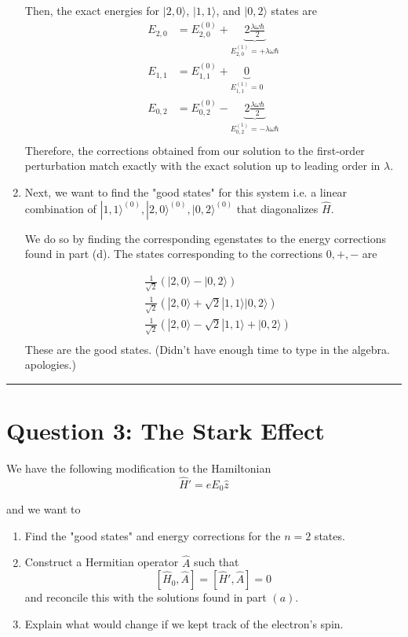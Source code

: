 \documentclass{article}
\newcommand{\ket}[1]{|#1 \rangle}
\begin{document}
\begin{enumerate}[label=(\alph*)]
  Then, the exact energies for $\ket{2,0}$, $\ket{1,1}$, and $\ket{0, 2}$ states are 
  \vskip 0.25cm
  \begin{align*}
    E_{2, 0} &= E_{2, 0}^{(0)} + \underbrace{2 \frac{\lambda \omega 
    \hbar}{2}}_{E_{2, 0}^{(1)} = +\lambda \omega \hbar} \\
    E_{1,1} &= E_{1,1}^{(0)} + \underbrace{0}_{E_{1,1}^{(1)} = 0} \\
    E_{0,2} &= E_{0,2}^{(0)} - \underbrace{2 \frac{\lambda \omega 
    \hbar}{2}}_{E_{0,2}^{(1)} = -\lambda \omega \hbar} \\
  \end{align*}
  Therefore, the corrections obtained from our solution to the first-order perturbation match exactly with the exact solution up to leading order in $\lambda$.

  \item Next, we want to find the "good states" for this system i.e. a linear combination of $\ket{1, 1}^{(0)}, \ket{2, 0}^{(0)}, \ket{0, 2}^{(0)}$ that diagonalizes $\hat{H}$.
  
  We do so by finding the corresponding egenstates to the energy corrections found in part (d). The states corresponding to the corrections $0, +, -$ are 

  \begin{align*}
    &\frac{1}{\sqrt{2}} \left( \ket{2, 0} - \ket{0, 2} \right) \\
    &\frac{1}{\sqrt{2}} \left( \ket{2, 0} + \sqrt{2}\ket{1,1} \ket{0, 2} \right) \\
    &\frac{1}{\sqrt{2}} \left( \ket{2, 0} - \sqrt{2}\ket{1,1} + \ket{0, 2} \right) \\
  \end{align*}
  These are the good states. (Didn't have enough time to type in the algebra. apologies.)
\end{enumerate}

\vskip 0.5cm 
\hrule 
\vskip 0.5cm
\pagebreak




\section*{Question 3: The Stark Effect} 

We have the following modification to the Hamiltonian 
\[ \hat{H}' = eE_0 \hat{z} \]

and we want to 
\begin{enumerate}[label=(\alph*)]
  \item Find the "good states" and energy corrections for the $n = 2$ states.
  \item Construct a Hermitian operator $\hat{A}$ such that 
  \[ \left[\hat{H}_0, \hat{A}\right] = \left[\hat{H}', \hat{A}\right] = 0  \]
  and reconcile this with the solutions found in part $(a)$.
  \item Explain what would change if we kept track of the electron's spin.
\end{enumerate}
\end{document}
